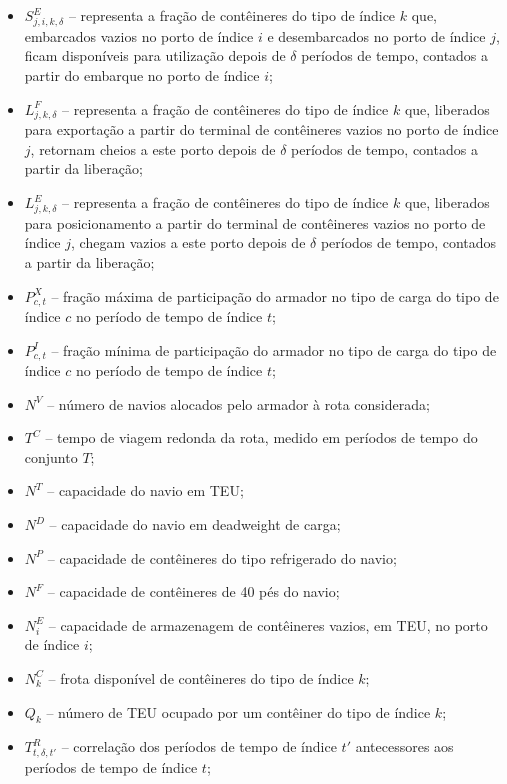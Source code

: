 \documentclass[preprint,10pt,5p]{elsarticle}
\begin{document}
\begin{itemize}
    \item \(S_{j,i,k,\delta}^{E}\) – representa a fração de contêineres do tipo de índice \(k\) que, embarcados vazios no porto de índice \(i\) e desembarcados no porto de índice \(j\), ficam disponíveis para utilização depois de \(\delta\) períodos de tempo, contados a partir do embarque no porto de índice \(i\);
    \item \(L_{j,k,\delta}^{F}\) – representa a fração de contêineres do tipo de índice \(k\) que, liberados para exportação a partir do terminal de contêineres vazios no porto de índice \(j\), retornam cheios a este porto depois de \(\delta\) períodos de tempo, contados a partir da liberação;
    \item \(L_{j,k,\delta}^{E}\) – representa a fração de contêineres do tipo de índice \(k\) que, liberados para posicionamento a partir do terminal de contêineres vazios no porto de índice \(j\), chegam vazios a este porto depois de \(\delta\) períodos de tempo, contados a partir da liberação;
    \item \(P_{c,t}^{X}\) – fração máxima de participação do armador no tipo de carga do tipo de índice \(c\) no período de tempo de índice \(t\);
    \item \(P_{c,t}^{I}\) – fração mínima de participação do armador no tipo de carga do tipo de índice \(c\) no período de tempo de índice \(t\);
    \item \(N^{V}\) – número de navios alocados pelo armador à rota considerada;
    \item \(T^{C}\) – tempo de viagem redonda da rota, medido em períodos de tempo do conjunto \(T\);
    \item \(N^{T}\) – capacidade do navio em TEU;
    \item \(N^{D}\) – capacidade do navio em deadweight de carga;
    \item \(N^{P}\) – capacidade de contêineres do tipo refrigerado do navio;
    \item \(N^{F}\) – capacidade de contêineres de 40 pés do navio;
    \item \(N_{i}^{E}\) – capacidade de armazenagem de contêineres vazios, em TEU, no porto de índice \(i\);
    \item \(N_{k}^{C}\) – frota disponível de contêineres do tipo de índice \(k\);
    \item \(Q_{k}\) – número de TEU ocupado por um contêiner do tipo de índice \(k\);
    \item \(T_{t,\delta,t'}^{R}\) – correlação dos períodos de tempo de índice \(t'\) antecessores aos períodos de tempo de índice \(t\);
\end{itemize}
\end{document}
